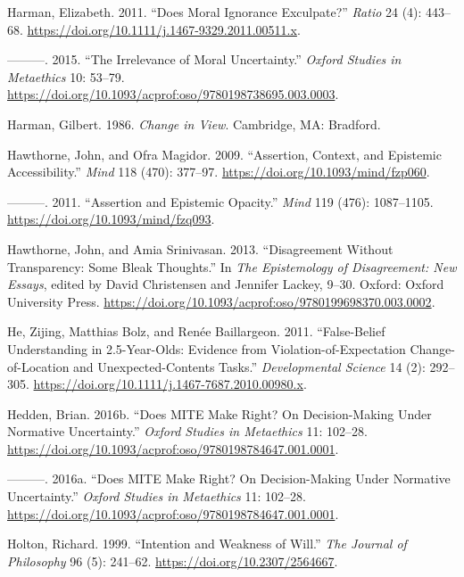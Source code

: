 \documentclass[
  10pt,
  letterpaper,
  twoside]{scrbook}
\newlength{\cslhangindent}
\newenvironment{CSLReferences}[2] %
 {\begin{list}{}{%
  \setlength{\itemindent}{0pt}
  \setlength{\leftmargin}{0pt}
  \setlength{\parsep}{0pt}
  \ifodd #1
   \setlength{\leftmargin}{\cslhangindent}
   \setlength{\itemindent}{-1\cslhangindent}
  \fi
  \setlength{\itemsep}{#2\baselineskip}}}
 {\end{list}}
\begin{document}
\begin{CSLReferences}{1}{0}
Harman, Elizabeth. 2011. {``Does Moral Ignorance Exculpate?''}
\emph{Ratio} 24 (4): 443--68.
\url{https://doi.org/10.1111/j.1467-9329.2011.00511.x}.

---------. 2015. {``The Irrelevance of Moral Uncertainty.''}
\emph{Oxford Studies in Metaethics} 10: 53--79.
\url{https://doi.org/10.1093/acprof:oso/9780198738695.003.0003}.

Harman, Gilbert. 1986. \emph{Change in View}. Cambridge, MA: Bradford.

Hawthorne, John, and Ofra Magidor. 2009. {``Assertion, Context, and
Epistemic Accessibility.''} \emph{Mind} 118 (470): 377--97.
\url{https://doi.org/10.1093/mind/fzp060}.

---------. 2011. {``Assertion and Epistemic Opacity.''} \emph{Mind} 119
(476): 1087--1105. \url{https://doi.org/10.1093/mind/fzq093}.

Hawthorne, John, and Amia Srinivasan. 2013. {``Disagreement Without
Transparency: Some Bleak Thoughts.''} In \emph{The Epistemology of
Disagreement: New Essays}, edited by David Christensen and Jennifer
Lackey, 9--30. Oxford: Oxford University Press.
\url{https://doi.org/10.1093/acprof:oso/9780199698370.003.0002}.

He, Zijing, Matthias Bolz, and Renée Baillargeon. 2011. {``False-Belief
Understanding in 2.5-Year-Olds: Evidence from Violation-of-Expectation
Change-of-Location and Unexpected-Contents Tasks.''} \emph{Developmental
Science} 14 (2): 292--305.
\url{https://doi.org/10.1111/j.1467-7687.2010.00980.x}.

Hedden, Brian. 2016b. {``Does MITE Make Right? On Decision-Making Under
Normative Uncertainty.''} \emph{Oxford Studies in Metaethics} 11:
102--28.
\url{https://doi.org/10.1093/acprof:oso/9780198784647.001.0001}.

---------. 2016a. {``Does MITE Make Right? On Decision-Making Under
Normative Uncertainty.''} \emph{Oxford Studies in Metaethics} 11:
102--28.
\url{https://doi.org/10.1093/acprof:oso/9780198784647.001.0001}.

Holton, Richard. 1999. {``Intention and Weakness of Will.''} \emph{The
Journal of Philosophy} 96 (5): 241--62.
\url{https://doi.org/10.2307/2564667}.


\end{CSLReferences}
\end{document}
